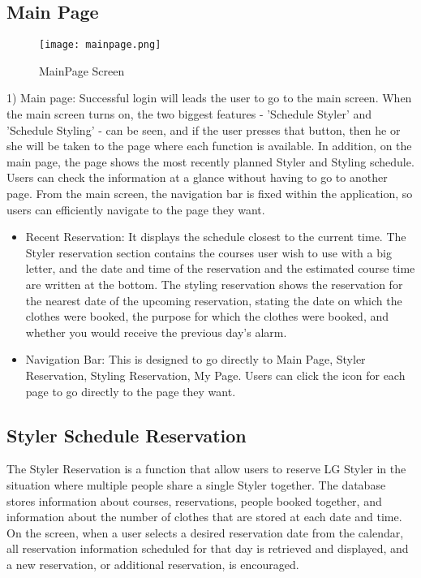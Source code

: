 \documentclass[conference]{IEEEtran}
\begin{document}
\subsection{Main Page}
\begin{figure}[htbp]
\centerline{\texttt{[image: mainpage.png]}}
\caption{MainPage Screen}
\label{fig}
\end{figure}
1) Main page: Successful login will leads the user to go to the main screen. When the main screen turns on, the two biggest features - 'Schedule Styler' and 'Schedule Styling' - can be seen, and if the user presses that button, then he or she will be taken to the page where each function is available.
In addition, on the main page, the page shows the most recently planned Styler and Styling schedule. Users can check the information at a glance without having to go to another page.
From the main screen, the navigation bar is fixed within the application, so users can efficiently navigate to the page they want.
\begin{itemize}
    \item Recent Reservation: It displays the schedule closest to the current time. The Styler reservation section contains the courses user wish to use with a big letter, and the date and time of the reservation and the estimated course time are written at the bottom. The styling reservation shows the reservation for the nearest date of the upcoming reservation, stating the date on which the clothes were booked, the purpose for which the clothes were booked, and whether you would receive the previous day's alarm.
    \item Navigation Bar: This is designed to go directly to Main Page, Styler Reservation, Styling Reservation, My Page. Users can click the icon for each page to go directly to the page they want.\\
\end{itemize}

\subsection{Styler Schedule Reservation}
The Styler Reservation is a function that allow users to reserve LG Styler in the situation where multiple people share a single Styler together. The database stores information about courses, reservations, people booked together, and information about the number of clothes that are stored at each date and time. On the screen, when a user selects a desired reservation date from the calendar, all reservation information scheduled for that day is retrieved and displayed, and a new reservation, or additional reservation, is encouraged.\\
\end{document}
